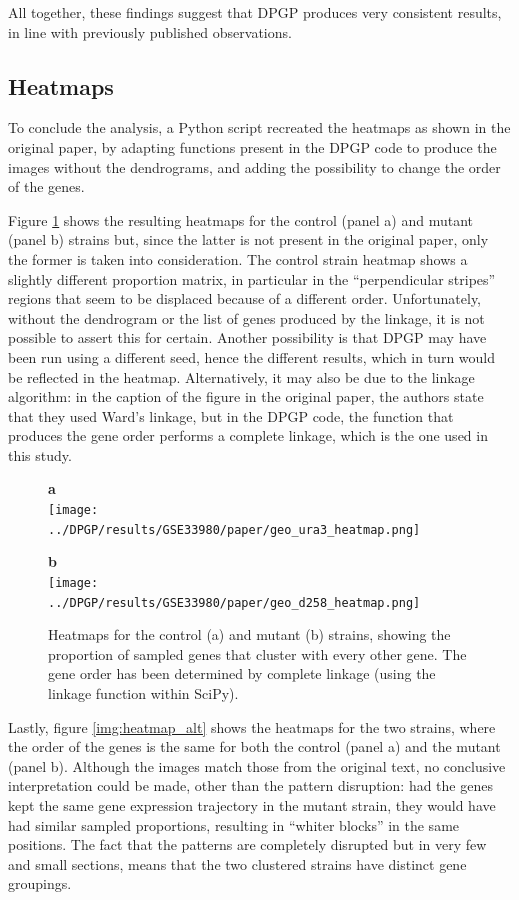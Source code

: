 All together, these findings suggest that DPGP produces very consistent results, in line with previously published observations.

\subsection{Heatmaps}
To conclude the analysis, a Python script recreated the heatmaps as shown in the original paper, by adapting functions present in the DPGP code to produce the images without the dendrograms, and adding the possibility to change the order of the genes.

Figure \ref{img:heatmap} shows the resulting heatmaps for the control (panel a) and mutant (panel b) strains but, since the latter is not present in the original paper, only the former is taken into consideration. The control strain heatmap shows a slightly different proportion matrix, in particular in the ``perpendicular stripes'' regions that seem to be displaced because of a different order. Unfortunately, without the dendrogram or the list of genes produced by the linkage, it is not possible to assert this for certain. Another possibility is that DPGP may have been run using a different seed, hence the different results, which in turn would be reflected in the heatmap. Alternatively, it may also be due to the linkage algorithm: in the caption of the figure in the original paper, the authors state that they used Ward's linkage, but in the DPGP code, the function that produces the gene order performs a complete linkage, which is the one used in this study.

\begin{figure}[!ht]
    \centering
    \parbox{.45\textwidth}{
        \textbf{a}\\
        \texttt{[image: ../DPGP/results/GSE33980/paper/geo\_ura3\_heatmap.png]}
    }
    \parbox{.45\textwidth}{
        \textbf{b}\\
        \texttt{[image: ../DPGP/results/GSE33980/paper/geo\_d258\_heatmap.png]}
    }
    \caption[Heatmap comparison between control and mutant clusters]{Heatmaps for the control (a) and mutant (b) strains, showing the proportion of sampled genes that cluster with every other gene. The gene order has been determined by complete linkage (using the linkage function within SciPy).}\label{img:heatmap}
\end{figure}

Lastly, figure \ref{img:heatmap_alt} shows the heatmaps for the two strains, where the order of the genes is the same for both the control (panel a) and the mutant (panel b). Although the images match those from the original text, no conclusive interpretation could be made, other than the pattern disruption: had the genes kept the same gene expression trajectory in the mutant strain, they would have had similar sampled proportions, resulting in ``whiter blocks'' in the same positions. The fact that the patterns are completely disrupted but in very few and small sections, means that the two clustered strains have distinct gene groupings.

